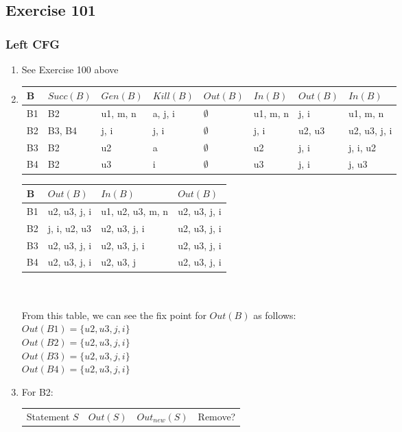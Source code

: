 \documentclass[12pt,fleqn]{article}		%
\begin{document}
\subsection{Exercise 101}
\subsubsection{Left CFG}
\begin{enumerate}
\item See Exercise 100 above
\item 
\begin{tabularx}{\textwidth}{| l | X | X | X || X | X || X | X ||}
\hline
B & $Succ(B) $ & $Gen(B)$ & $Kill(B)$ & $Out(B)$ & $In(B)$ & $Out(B)$ & $In(B)$\\
\hline
B1 & B2 & u1, m, n & a, j, i & $\emptyset$ & u1, m, n & j, i & u1, m, n \\
\hline
B2 & B3, B4 & j, i & j, i & $\emptyset$ & j, i & u2, u3 & u2, u3, j, i \\
\hline
B3 & B2 & u2 & a & $\emptyset$ & u2 & j, i & j, i, u2 \\
\hline
B4 & B2 & u3 & i & $\emptyset$ & u3 & j, i & j, u3 \\
\hline
\end{tabularx}
\begin{tabularx}{\textwidth}{| l || X | X || X |}
\hline
B & $Out(B)$ & $In(B)$ & $Out(B)$\\
\hline
B1 & u2, u3, j, i & u1, u2, u3, m, n & u2, u3, j, i\\
\hline
B2 & j, i, u2, u3 & u2, u3, j, i & u2, u3, j, i\\
\hline
B3 & u2, u3, j, i & u2, u3, j, i & u2, u3, j, i\\
\hline
B4 & u2, u3, j, i & u2, u3, j & u2, u3, j, i\\
\hline
\end{tabularx}
\\\\
From this table, we can see the fix point for $Out(B)$ as follows:\\
$Out(B1) = \{u2, u3, j, i\}$\\
$Out(B2) = \{u2, u3, j, i\}$\\
$Out(B3) = \{u2, u3, j, i\}$\\
$Out(B4) = \{u2, u3, j, i\}$\\
\item 
For B2:\\
\begin{tabularx}{\textwidth}{X X X X}
Statement $S$ & $Out(S)$ & $Out_{new}(S)$ & Remove?\\

\end{tabularx}
\end{enumerate}
\end{document}
